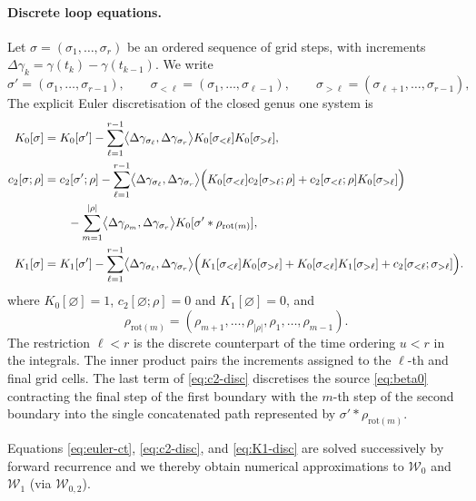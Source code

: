 \documentclass[11pt,a4paper]{article}
\begin{document}
\paragraph{Discrete loop equations.}
Let $\sigma=(\sigma_1,\dots,\sigma_r)$ be an ordered sequence of grid
steps, with increments $\Delta\gamma_k=\gamma(t_k)-\gamma(t_{k-1})$. We write
\begin{equation}
\sigma'=(\sigma_1,\dots,\sigma_{r-1}),\qquad
\sigma_{<\ell}=(\sigma_1,\dots,\sigma_{\ell-1}),\qquad
\sigma_{>\ell}=(\sigma_{\ell+1},\dots,\sigma_{r-1}),
\end{equation}
The explicit Euler discretisation of the closed genus one system is
\begin{align}
  K_0[\sigma]&= K_0[\sigma'] - \sum_{\ell=1}^{r-1}\bigl\langle\Delta\gamma_{\sigma_\ell}, \Delta\gamma_{\sigma_r}\bigr\rangle K_0[\sigma_{<\ell}]K_0[\sigma_{>\ell}],
  \label{eq:euler-ct}\\
  c_2[\sigma;\rho] &= c_2[\sigma';\rho] - \sum_{\ell=1}^{r-1} \bigl\langle\Delta\gamma_{\sigma_\ell}, \Delta\gamma_{\sigma_r}\bigr\rangle \Bigl(K_0[\sigma_{<\ell}]c_2[\sigma_{>\ell};\rho]+c_2[\sigma_{<\ell};\rho]K_0[\sigma_{>\ell}]\Bigr)\\
  &\qquad - \sum_{m=1}^{|\rho|} \bigl\langle\Delta\gamma_{\rho_m}, \Delta\gamma_{\sigma_r}\bigr\rangle K_0[\sigma'*\rho_{\mathrm{rot}(m)}],
  \label{eq:c2-disc}\\
  K_1[\sigma] &= K_1[\sigma'] - \sum_{\ell=1}^{r-1} \bigl\langle\Delta\gamma_{\sigma_\ell},\Delta\gamma_{\sigma_r}\bigr\rangle \Bigl(
    K_1[\sigma_{<\ell}]K_0[\sigma_{>\ell}] +K_0[\sigma_{<\ell}]K_1[\sigma_{>\ell}] +c_2[\sigma_{<\ell};\sigma_{>\ell}]\Bigr).
  \label{eq:K1-disc}
\end{align}
where $K_0[\varnothing]=1$, $c_2[\varnothing;\rho]=0$ and $K_1[\varnothing]=0$, and
\begin{equation}
\rho_{\mathrm{rot}(m)} =(\rho_{m+1},\dots,\rho_{|\rho|}, \rho_1,\dots,\rho_{m-1}).
\end{equation}
The restriction $\ell<r$ is the discrete counterpart of the  time ordering $u<r$ in the integrals. The inner product pairs
the increments assigned to the $\ell$-th and final grid cells. The last term of \eqref{eq:c2-disc} discretises the source \eqref{eq:beta0} contracting the final step of the first boundary with the $m$-th step of the second boundary into the single concatenated path represented by $\sigma'*\rho_{\mathrm{rot}(m)}$.

Equations \eqref{eq:euler-ct}, \eqref{eq:c2-disc}, and
\eqref{eq:K1-disc} are solved successively by forward recurrence and we thereby obtain numerical approximations to $\mathcal{W}_0$ and $\mathcal{W}_1$ (via $\mathcal{W}_{0,2}$).
\end{document}
